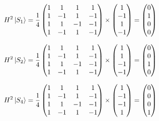 \documentclass{article}
\begin{document}
\begin{equation*}
H^2\Ket{S_1} = \frac{1}{4}
\begin{pmatrix}
1 & 1 & 1 & 1\\
1 & -1 & 1 & -1\\
1 & 1 & -1 & -1\\
1 & -1 & 1 & -1
\end{pmatrix}
\times
\begin{pmatrix}
1 \\
-1 \\
1 \\
-1
\end{pmatrix}
=
\begin{pmatrix}
0 \\
1 \\
0 \\
0
\end{pmatrix}
\end{equation*}

\begin{equation*}
H^2\Ket{S_2} = \frac{1}{4}
\begin{pmatrix}
1 & 1 & 1 & 1\\
1 & -1 & 1 & -1\\
1 & 1 & -1 & -1\\
1 & -1 & 1 & -1
\end{pmatrix}
\times
\begin{pmatrix}
1 \\
1 \\
-1 \\
-1
\end{pmatrix}
=
\begin{pmatrix}
0 \\
0 \\
1 \\
0
\end{pmatrix}
\end{equation*}


\begin{equation*}
H^2\Ket{S_4} = \frac{1}{4}
\begin{pmatrix}
1 & 1 & 1 & 1\\
1 & -1 & 1 & -1\\
1 & 1 & -1 & -1\\
1 & -1 & 1 & -1
\end{pmatrix}
\times
\begin{pmatrix}
1 \\
-1 \\
-1 \\
1
\end{pmatrix}
=
\begin{pmatrix}
0 \\
0 \\
0 \\
1
\end{pmatrix}
\end{equation*}
\end{document}
